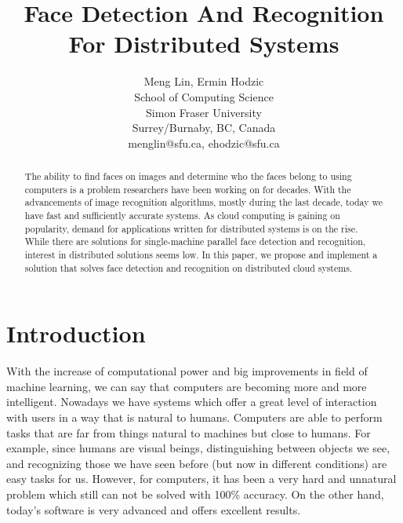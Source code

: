 \documentclass[11pt, draftclsnofoot, onecolumn]{IEEEtran}
\begin{document}
\title{Face Detection And Recognition For Distributed Systems}

\author{Meng Lin, Ermin Hodzic\\
        School of Computing Science\\
        Simon Fraser University\\
        Surrey/Burnaby, BC, Canada \\
        menglin@sfu.ca, ehodzic@sfu.ca  \\ 
}



\date{}
\maketitle

\begin{abstract}

The ability to find faces on images and determine who the faces belong to using computers is a problem researchers have been working on for decades. With the advancements of image recognition algorithms, mostly during the last decade, today we have fast and sufficiently accurate systems. As cloud computing is gaining on popularity, demand for applications written for distributed systems is on the rise. While there are solutions for single-machine parallel face detection and recognition, interest in distributed solutions seems low. In this paper, we propose and implement a solution that solves face detection and recognition on distributed cloud systems.

\end{abstract}


\section{Introduction} \label{sec:introduction}

With the increase of computational power and big improvements in field of machine learning, we can say that computers are becoming more and more intelligent. Nowadays we have systems which offer a great level of interaction with users in a way that is natural to humans. Computers are able to perform tasks that are far from things natural to machines but close to humans. For example, since humans are visual beings, distinguishing between objects we see, and recognizing those we have seen before (but now in different conditions) are easy tasks for us. However, for computers, it has been a very hard and unnatural problem which still can not be solved with 100\% accuracy. On the other hand, today's software is very advanced and offers excellent results.
\end{document}

